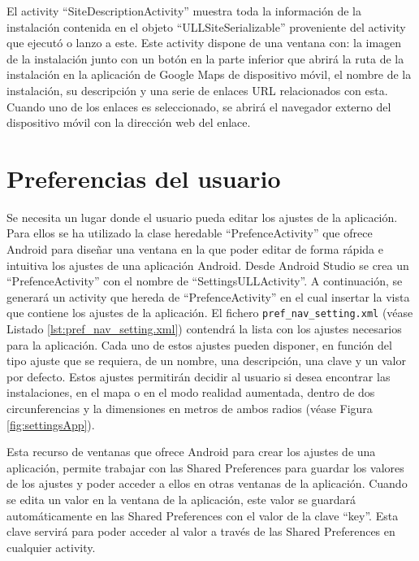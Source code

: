 El activity ``SiteDescriptionActivity'' muestra toda la información de la instalación contenida en el objeto ``ULLSiteSerializable'' proveniente del activity que ejecutó o lanzo a este. Este activity dispone de una ventana con: la imagen de la instalación junto con un botón en la parte inferior que abrirá la ruta de la instalación en la aplicación de Google Maps de dispositivo móvil, el nombre de la instalación, su descripción y una serie de enlaces URL relacionados con esta. Cuando uno de los enlaces es seleccionado, se abrirá el navegador externo del dispositivo móvil con la dirección web del enlace.

  

 
     
\section{Preferencias del usuario}

Se necesita un lugar donde el usuario pueda editar los ajustes de la aplicación. Para ellos se ha utilizado la clase heredable ``PrefenceActivity'' que ofrece Android para diseñar una ventana en la que poder editar de forma rápida e intuitiva los ajustes de una aplicación Android. Desde Android Studio se crea un ``PrefenceActivity'' con el nombre de ``SettingsULLActivity''. A continuación, se generará un activity que hereda de ``PrefenceActivity'' en el cual insertar la vista que contiene los ajustes de la aplicación. El fichero \texttt{pref\_nav\_setting.xml} (véase Listado \ref{lst:pref_nav_setting.xml}) contendrá la lista con los ajustes necesarios para la aplicación. Cada uno de estos ajustes pueden disponer, en función del tipo ajuste que se requiera, de un nombre, una descripción, una clave y un valor por defecto. Estos ajustes permitirán decidir al usuario si desea encontrar las instalaciones, en el mapa o en el modo realidad aumentada, dentro de dos circunferencias y la dimensiones en metros de ambos radios (véase Figura \ref{fig:settingsApp}).
 


Esta recurso de ventanas que ofrece Android para crear los ajustes de una aplicación, permite trabajar con las Shared Preferences para guardar los valores de los ajustes y poder acceder a ellos en otras ventanas de la aplicación. Cuando se edita un valor en la ventana de la aplicación, este valor se guardará automáticamente en las Shared Preferences con el valor de la clave ``key''. Esta clave servirá para poder acceder al valor a través de las Shared Preferences en cualquier activity.

